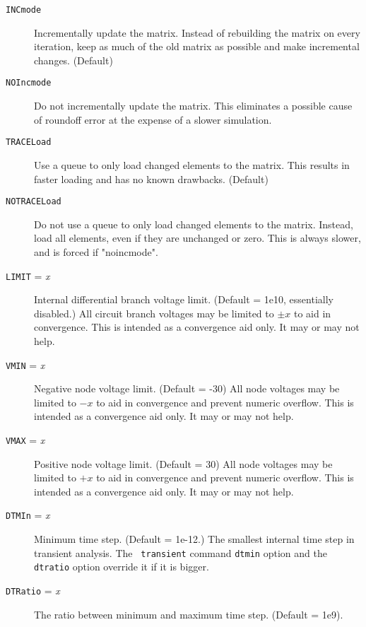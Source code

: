 \begin{description}
\item[{\tt INCmode}] Incrementally update the matrix.  Instead of 
rebuilding the matrix on every iteration, keep as much of the old 
matrix as possible and make incremental changes.  (Default)

\item[{\tt NOIncmode}] Do not incrementally update the matrix.  This
eliminates a possible cause of roundoff error at the expense of a slower
simulation.

\item[{\tt TRACELoad}] Use a queue to only load changed elements
to the matrix.  This results in faster loading and has no known
drawbacks.  (Default)

\item[{\tt NOTRACELoad}] Do not use a queue to only load changed
elements to the matrix.  Instead, load all elements, even if they
are unchanged or zero.  This is always slower, and is forced if
"noincmode".

\item[{\tt LIMIT} = {\it x}] Internal differential branch voltage
limit.  (Default = 1e10, essentially disabled.)  All circuit branch
voltages may be limited to $\pm x$ to aid in convergence.  This is
intended as a convergence aid only.  It may or may not help.

\item[{\tt VMIN} = {\it x}] Negative node voltage limit.  (Default
= -30)  All node voltages may be limited to $-x$ to aid in convergence
and prevent numeric overflow.  This is intended as a convergence
aid only.  It may or may not help.

\item[{\tt VMAX} = {\it x}] Positive node voltage limit.  (Default
= 30)  All node voltages may be limited to $+x$ to aid in convergence
and prevent numeric overflow.  This is intended as a convergence
aid only.  It may or may not help.

\item[{\tt DTMIn} = {\it x}] Minimum time step.  (Default = 1e-12.)
The smallest internal time step in transient analysis.  The {\tt
transient} command {\tt dtmin} option and the {\tt dtratio} option
override it if it is bigger.

\item[{\tt DTRatio} = {\it x}] The ratio between minimum and maximum
time step.  (Default = 1e9).


\end{description}
